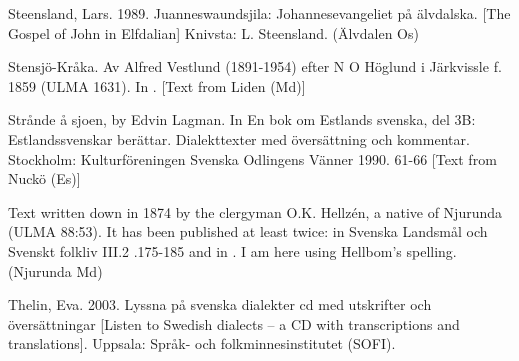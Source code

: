 \begin{listWWNumileveli}
\begin{styleSource}
\end{styleSource}

\item {}

\begin{styleSource}
\label{bkm:Ref150065761}Steensland, Lars. 1989. Juanneswaundsjila: Johannesevangeliet på älvdalska. [The Gospel of John in Elfdalian] Knivsta: L. Steensland. (Älvdalen Os)

\end{styleSource}

\item {}

\begin{styleSource}
\label{bkm:Ref154221412}Stensjö-Kråka. Av Alfred Vestlund (1891-1954) efter N O Höglund i Järkvissle f. 1859 (ULMA 1631). In \citet[17-19]{Hellbom1980}. [Text from Liden (Md)]

\end{styleSource}

\item {}

\begin{styleSource}
\label{bkm:Ref223343666}Strånde å sjoen, by Edvin Lagman. In En bok om Estlands svenska, del 3B: Estlandssvenskar berättar. Dialekttexter med översättning och kommentar. Stockholm: Kulturföreningen Svenska Odlingens Vänner 1990.  61-66 [Text from Nuckö (Es)]

\end{styleSource}

\item {}

\begin{styleSource}
\label{bkm:Ref154302630}Text written down in 1874 by the clergyman O.K. Hellzén, a native of Njurunda (ULMA 88:53). It has been published at least twice: in Svenska Landsmål och Svenskt folkliv III.2 .175-185 and in \citet[92-107]{Hellbom1980}. I am here using Hellbom’s spelling. (Njurunda Md)

\end{styleSource}

\item {}

\begin{styleSource}
Thelin, Eva. 2003. Lyssna på svenska dialekter cd med utskrifter och översättningar [Listen to Swedish dialects – a CD with transcriptions and translations]. Uppsala: Språk- och folkminnesinstitutet (SOFI).

\end{styleSource}


\end{listWWNumileveli}

